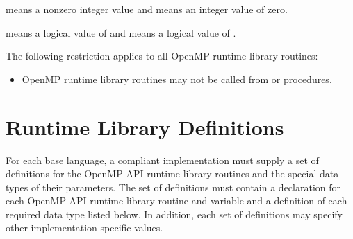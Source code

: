 \begin{samepage}
\begin{ccppspecific}
 means a nonzero integer value and  means 
an integer value of zero.
\end{ccppspecific}
\end{samepage}
\bigskip

\begin{samepage}
\begin{fortranspecific}
 means a logical value of  and  
means a logical value of .
\end{fortranspecific}
\end{samepage}
\bigskip

\begin{samepage}

\begin{fortranspecific}

\restrictions
The following restriction applies to all OpenMP runtime library routines:

\begin{itemize}
\item OpenMP runtime library routines may not be called 
      from  or  procedures.
\end{itemize}
\end{fortranspecific}
\end{samepage}



\section{Runtime Library Definitions}
\label{sec:runtime library definitions}
For each base language, a compliant implementation must supply a set of 
definitions for the OpenMP API runtime library routines and the special 
data types of their parameters. The set of definitions must contain a 
declaration for each OpenMP API runtime library routine and variable and 
a definition of each required data type listed below. In addition, each 
set of definitions may specify other implementation specific values.

